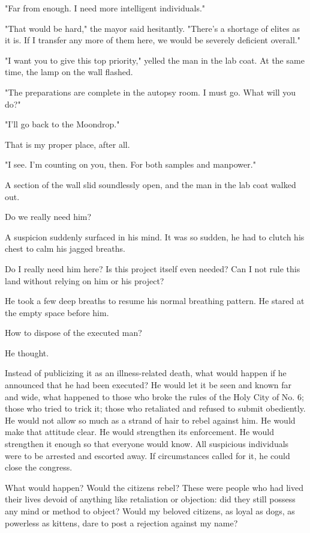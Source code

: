 "Far from enough. I need more intelligent individuals."

"That would be hard," the mayor said hesitantly. "There's a shortage of
elites as it is. If I transfer any more of them here, we would be
severely deficient overall."

"I want you to give this top priority," yelled the man in the lab coat.
At the same time, the lamp on the wall flashed.

"The preparations are complete in the autopsy room. I must go. What will
you do?"

"I'll go back to the Moondrop."

That is my proper place, after all.

"I see. I'm counting on you, then. For both samples and manpower."

A section of the wall slid soundlessly open, and the man in the lab coat
walked out.

Do we really need him?

A suspicion suddenly surfaced in his mind. It was so sudden, he had to
clutch his chest to calm his jagged breaths.

Do I really need him here? Is this project itself even needed? Can I not
rule this land without relying on him or his project?

He took a few deep breaths to resume his normal breathing pattern. He
stared at the empty space before him.

How to dispose of the executed man?

He thought.

Instead of publicizing it as an illness-related death, what would happen
if he announced that he had been executed? He would let it be seen and
known far and wide, what happened to those who broke the rules of the
Holy City of No. 6; those who tried to trick it; those who retaliated
and refused to submit obediently. He would not allow so much as a strand
of hair to rebel against him. He would make that attitude clear. He
would strengthen its enforcement. He would strengthen it enough so that
everyone would know. All suspicious individuals were to be arrested and
escorted away. If circumstances called for it, he could close the
congress.

What would happen? Would the citizens rebel? These were people who had
lived their lives devoid of anything like retaliation or objection: did
they still possess any mind or method to object? Would my beloved
citizens, as loyal as dogs, as powerless as kittens, dare to post a
rejection against my name?

